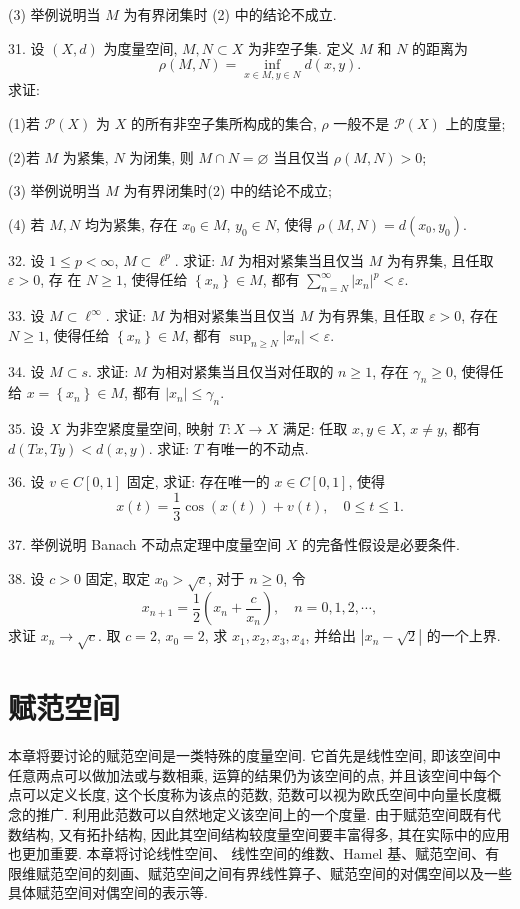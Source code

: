 \documentclass[openany]{ctexbook}
\theoremstyle{kaiti}
\theoremstyle{normal}
\begin{document}
(3) 举例说明当 $M$ 为有界闭集时 (2) 中的结论不成立.

31. 设 $(X, d)$ 为度量空间, $M, N \subset X$ 为非空子集. 定义 $M$ 和 $N$ 的距离为
$$
\rho(M, N)=\inf_{x \in M, y \in N} d(x, y).
$$
求证:

(1)若 $\mathcal{P}(X)$ 为 $X$ 的所有非空子集所构成的集合, $\rho$ 一般不是 $\mathcal{P}(X)$ 上的度量;

(2)若 $M$ 为紧集, $N$ 为闭集, 则 $M \cap N=\varnothing$ 当且仅当 $\rho(M, N)>0$;

(3) 举例说明当 $M$ 为有界闭集时(2) 中的结论不成立;

(4) 若 $M, N$ 均为紧集, 存在 $x_0 \in M$, $y_0 \in N$, 使得 $\rho(M, N)=d\left(x_0, y_0\right)$.

32. 设 $1 \leqslant p<\infty$, $M \subset \ell^{p}$. 求证: $M$ 为相对紧集当且仅当 $M$ 为有界集, 且任取 $\varepsilon>0$, 存
在 $N \geqslant 1$, 使得任给 $\left\{x_n\right\} \in M$, 都有 $\sum_{n=N}^{\infty}\left|x_n\right|^{p}<\varepsilon$.

33. 设 $M \subset \ell^{\infty}$. 求证: $M$ 为相对紧集当且仅当 $M$ 为有界集, 且任取 $\varepsilon>0$, 存在 $N \geqslant 1$, 使得任给 $\left\{x_n\right\} \in M$, 都有 $\sup_{n \geqslant N}\left|x_n\right|<\varepsilon$.

34. 设 $M \subset s$. 求证: $M$ 为相对紧集当且仅当对任取的 $n \geqslant 1$, 存在 $\gamma_n \geqslant 0$, 使得任给 $x=\left\{x_n\right\} \in M$, 都有 $\left|x_n\right| \leqslant \gamma_n.$

35. 设 $X$ 为非空紧度量空间, 映射 $T: X \rightarrow X$ 满足: 任取 $x, y \in X$, $x \neq y$, 都有 $d(T x, T y)<d(x, y)$. 求证: $T$ 有唯一的不动点.

36. 设 $v \in C[0,1]$ 固定, 求证: 存在唯一的 $x \in C[0,1]$, 使得
$$
x(t)=\frac{1}{3} \cos (x(t))+v(t), \quad 0 \leqslant t \leqslant 1.
$$

37. 举例说明 Banach 不动点定理中度量空间 $X$ 的完备性假设是必要条件.

38. 设 $c>0$ 固定, 取定 $x_0>\sqrt{c}$, 对于 $n \geqslant 0$, 令
$$
x_{n+1}=\frac{1}{2}\left(x_n+\frac{c}{x_n}\right), \quad n=0,1,2, \cdots,
$$
求证 $x_n \rightarrow \sqrt{c}$. 取 $c=2$, $x_0=2$, 求 $x_1, x_2, x_3, x_4$, 并给出 $\left|x_n-\sqrt{2}\right|$ 的一个上界.

\chapter{赋范空间}

本章将要讨论的赋范空间是一类特殊的度量空间. 它首先是线性空间, 即该空间中任意两点可以做加法或与数相乘, 运算的结果仍为该空间的点, 并且该空间中每个点可以定义长度, 这个长度称为该点的范数, 范数可以视为欧氏空间中向量长度概念的推广. 利用此范数可以自然地定义该空间上的一个度量. 由于赋范空间既有代数结构, 又有拓扑结构, 因此其空间结构较度量空间要丰富得多, 其在实际中的应用也更加重要. 本章将讨论线性空间、 线性空间的维数、Hamel 基、赋范空间、有限维赋范空间的刻画、赋范空间之间有界线性算子、赋范空间的对偶空间以及一些具体赋范空间对偶空间的表示等.
\end{document}
